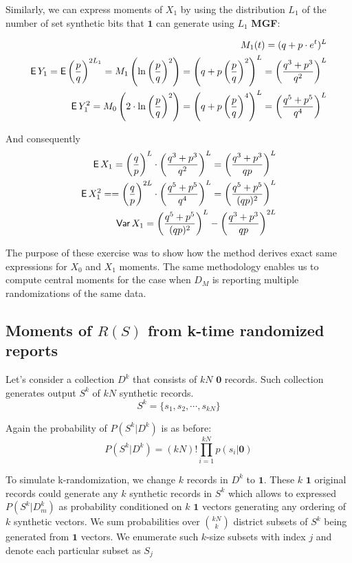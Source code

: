 \documentclass[11pt]{article}
\newcommand{\zv}{\textbf{0}}
\newcommand{\uv}{\textbf{1}}
\begin{document}
Similarly, we can express moments of $X_1$ by using the distribution $L_1$ of the number of set synthetic bits that $\uv$ can generate using $L_1$ \textbf{MGF}:

\begin{align}
M_1(t) = (q + p \cdot e^t)^L \\
 \operatorname{\mathsf{E}} Y_1 = \operatorname{\mathsf{E}} \left ( \frac{p} {q} \right )^{2L_1} = M_1 \left (\ln{ \left ( \frac{p} {q} \right )^2} \right) = \left (q + p \left ( \frac{p} {q} \right )^2 \right )^L =  \left ( \frac{q^3 + p^3} {q^2} \right )^L \\
 \operatorname{\mathsf{E}} Y_1^2 = M_0 \left (2 \cdot \ln{ \left ( \frac{p} {q} \right )^2} \right) = \left (q + p \left ( \frac{p} {q} \right )^4 \right )^L =  \left ( \frac{q^5 + p^5} {q^4} \right )^L
\end{align}

And consequently
\begin{align}
 \operatorname{\mathsf{E}} X_1 =   \left ( \frac{q} {p} \right )^{L}   \cdot  \left ( \frac{q^3 + p^3} {q^2} \right )^L =  \left ( \frac{q^3 + p^3} {qp} \right )^L\\
 \operatorname{\mathsf{E}} X^2_1 ==  \left ( \frac{q} {p} \right )^{2L}  \cdot \left ( \frac{q^5 + p^5} {q^4} \right )^L =  \left ( \frac{q^5 + p^5} {(qp)^2} \right )^L\\
 \operatorname{\mathsf{Var}} X_1 =  \left ( \frac{q^5 + p^5} {(qp)^2} \right )^L - \left ( \frac{q^3 + p^3} {qp} \right )^{2L}
 \end{align}

The purpose of these exercise was to show how the method derives exact same expressions for $X_0$ and $X_1$ moments.  The same methodology enables us to compute central moments for the case when $D_M$ is reporting multiple randomizations of the same data.

\subsection{Moments of $R(S)$ from k-time randomized reports}


Let's consider a collection $D^k$ that consists of $kN$ $\zv$ records. Such collection generates output $S^k$ of $kN$ synthetic records.
\[ S^k = \{s_1, s_2, \cdots , s_{kN} \} \]

Again the probability of $P(S^k|D^k)$ is as before:
\[ P(S^k|D^k) = (kN)! \prod_{i=1}^{kN} p(s_i| \zv ) \]


To simulate k-randomization, we change $k$ records in $D^k$ to $\uv$.   These $k$ $\uv$ original records could generate any $k$ synthetic records in $S^k$ which allows to expressed $P(S^k|D^k_m)$ as probability conditioned on $k$ $\uv$ vectors generating any ordering of $k$ synthetic vectors.  We sum probabilities over $\binom{kN}{k}$ district subsets of $S^k$ being generated from $\uv$ vectors.  We enumerate such $k$-size subsets with index $j$ and denote each particular subset as $S_j$
\end{document}
